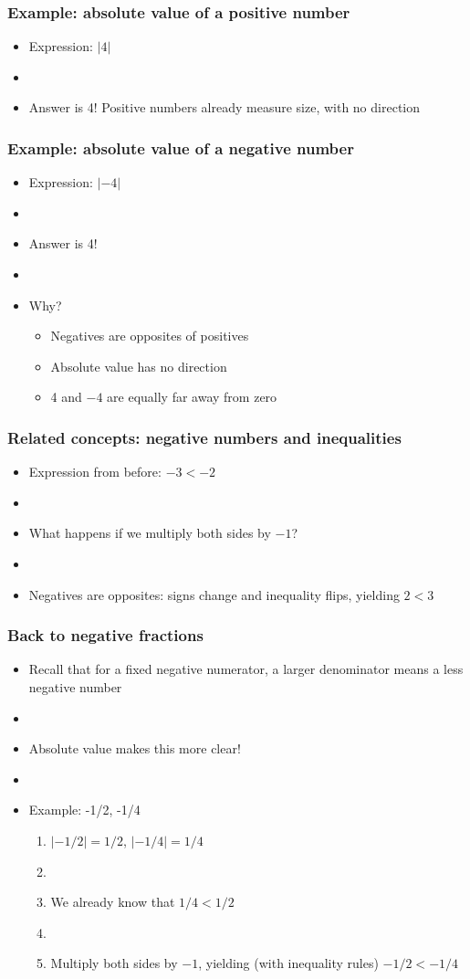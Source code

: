 \documentclass[11pt]{beamer}
\newcommand{\myframe}[1]{\begin{frame} \frametitle{#1}}
\begin{document}
\myframe{Example: absolute value of a positive number}
\begin{itemize}
\item Expression: $|4|$
\item[]
\item Answer is 4! Positive numbers already measure size, with no direction
\end{itemize}
\end{frame}

\myframe{Example: absolute value of a negative number}
\begin{itemize}
\item Expression: $|-4|$
\item[]
\item Answer is 4!
\item[]
\item Why?
\begin{itemize}
\item Negatives are opposites of positives
\item Absolute value has no direction
\item 4 and $-4$ are equally far away from zero
\end{itemize}
\end{itemize}
\end{frame}

\myframe{Related concepts: negative numbers and inequalities}
\begin{itemize}
\item Expression from before: $-3 < -2$
\item[]
\item What happens if we multiply both sides by $-1$?
\item[]
\item Negatives are opposites: signs change and inequality flips, yielding $2 < 3$
\end{itemize}
\end{frame}

\myframe{Back to negative fractions}
\begin{itemize}
\item Recall that for a fixed negative numerator, a larger denominator means a less negative number 
\item[]
\item Absolute value makes this more clear!
\item[]
\item Example: -1/2, -1/4
\begin{enumerate}
\item $|-1/2| = 1/2$, $|-1/4| = 1/4$
\item[]
\item We already know that $1/4 < 1/2$
\item[]
\item Multiply both sides by $-1$, yielding (with inequality rules) $-1/2 < -1/4$
\end{enumerate}
\end{itemize}
\end{frame}
\end{document}
